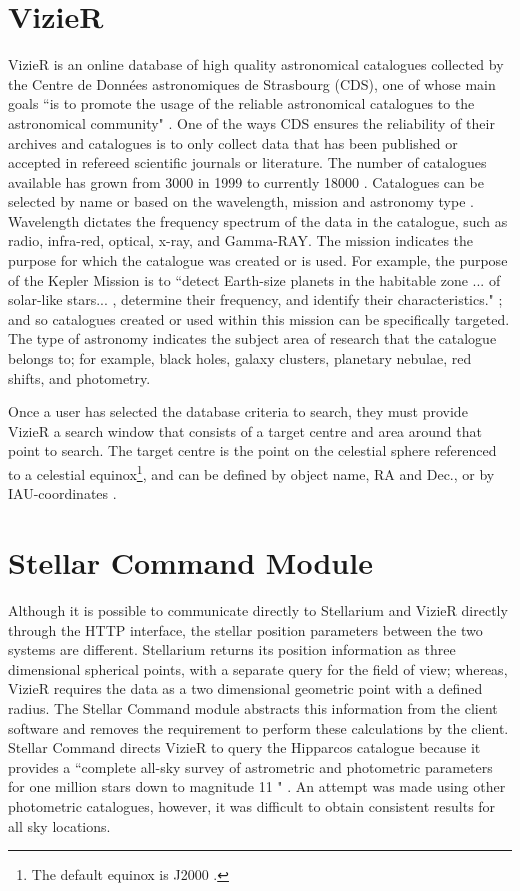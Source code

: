 \section{VizieR}
VizieR is an online database of high quality astronomical catalogues collected by the Centre de Donn\'ees astronomiques de Strasbourg (CDS), one of whose main goals  ``is to promote the usage of the reliable astronomical catalogues to the astronomical community" \cite[p.~25]{ochsenbein2000vizier}. One of the ways CDS ensures the reliability of their archives and catalogues is to only collect data that has been published or accepted in refereed scientific journals or literature. The number of catalogues available has grown from 3000 in 1999  \cite[p.~24]{ochsenbein2000vizier} to currently 18000 \cite{VizierPage}. Catalogues can be selected by name or based on the wavelength, mission and astronomy type \cite{vizquery}.  Wavelength dictates the frequency spectrum of the data in the catalogue, such as radio, infra-red, optical, x-ray, and Gamma-RAY. The mission indicates the purpose for which the catalogue was created or is used. For example, the purpose of the Kepler Mission is to ``detect Earth-size planets in the habitable zone ... of solar-like stars... , determine their frequency, and identify their characteristics." \cite[p.~2]{koch2010kepler}; and so catalogues created or used within this mission can be specifically targeted. The type of astronomy indicates the subject area of research that the catalogue belongs to; for example,  black holes, galaxy clusters, planetary nebulae, red shifts, and photometry. 

Once a user has selected the database criteria to search, they must provide VizieR  a search window that consists of a target centre and area around that point to search. The target centre is the point on the celestial sphere referenced to a celestial equinox\footnote{The default equinox is J2000 \cite{vizquery}.}, and can be defined by object name,  RA and Dec., or by IAU-coordinates \cite{vizquerytarget}.


\section{Stellar Command Module}
Although it is possible to communicate directly to Stellarium and VizieR directly through the HTTP interface, the stellar position parameters between the two systems are different. Stellarium returns its position information as three dimensional spherical points, with a separate query for the field of view; whereas, VizieR requires the data as a two dimensional geometric point with a defined radius. The Stellar Command module abstracts this information from the client software and removes the requirement to perform these calculations by the client. Stellar Command directs VizieR to query the Hipparcos catalogue because it provides a ``complete all-sky survey of astrometric and photometric parameters for one million stars down to magnitude 11 " \cite [p. ~201]{van1997hipparcos}. An attempt was made using other photometric catalogues, however, it was difficult to obtain consistent results for all sky locations.

